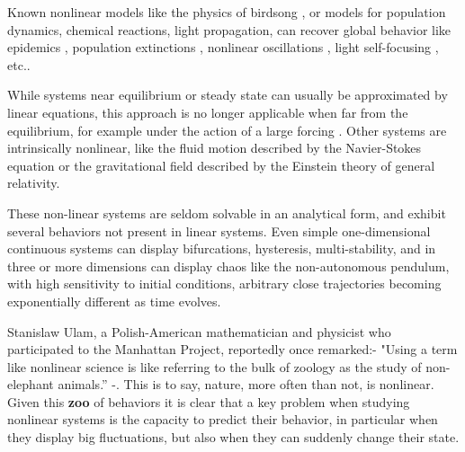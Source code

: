 %	
%	
%	
%	
%	
%	
%	


Known nonlinear models like the physics of birdsong \citep{Mindlin2005}, or models for population dynamics, chemical reactions, light propagation, can recover global behavior like epidemics \citep{Southall2021}, population extinctions \citep{Jackson2001}, nonlinear oscillations \citep{Diz-Pita2021}, light self-focusing \citep{Bejot2011}, etc.. 

While systems near equilibrium  or steady state can usually be approximated by linear equations, this approach is no longer applicable when far from the equilibrium, for example under the action of a large forcing \citep{Londono2015}. 
Other systems are  intrinsically nonlinear, like the fluid motion described by the Navier-Stokes equation or the gravitational field described by the Einstein theory of general relativity.%


These non-linear systems are seldom solvable in an analytical form, and exhibit several behaviors not present in linear systems. Even simple one-dimensional continuous systems can display bifurcations, hysteresis, multi-stability, and in three or more dimensions can display chaos like the non-autonomous pendulum, with high sensitivity to initial conditions,  arbitrary close trajectories becoming exponentially different as time evolves. 


Stanislaw Ulam, a Polish-American mathematician and physicist who participated to the Manhattan Project, reportedly once remarked:- "Using a term like nonlinear science is like referring to the bulk of zoology as the study of non-elephant animals.” -.
This is to say, nature, more often than not,  is nonlinear.
Given this \textbf{zoo} of behaviors it is clear that a key problem when studying nonlinear systems is the capacity to predict their behavior, in particular when they  display big fluctuations, but also when they can suddenly change their state. 

